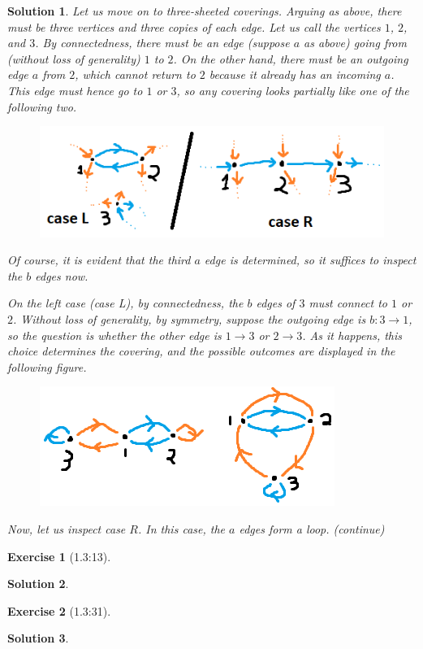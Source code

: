 \documentclass{article}
\theoremstyle{plain}
\newtheorem*{ex}{Exercise}
\theoremstyle{nonumberplain}
\newtheorem{sol}{Solution}
\begin{document}
\begin{sol}
\medskip

Let us move on to three-sheeted coverings. Arguing as above, there must be three vertices and three copies of each edge. Let us call the vertices $1$, $2$, and $3$. By connectedness, there must be an edge (suppose $a$ as above) going from (without loss of generality) $1$ to $2$. On the other hand, there must be an outgoing edge $a$ from $2$, which cannot return to $2$ because it already has an incoming $a$. This edge must hence go to $1$ or $3$, so any covering looks partially like one of the following two.
\begin{figure}[H]
\centering
\includegraphics[width=\linewidth]{cov3}
\end{figure}

Of course, it is evident that the third $a$ edge is determined, so it suffices to inspect the $b$ edges now.

On the left case (case L), by connectedness, the $b$ edges of $3$ must connect to $1$ or $2$. Without loss of generality, by symmetry, suppose the outgoing edge is $b \colon 3 \to 1$, so the question is whether the other edge is $1 \to 3$ or $2 \to 3$. As it happens, this choice determines the covering, and the possible outcomes are displayed in the following figure.
\begin{figure}[H]
\centering
\includegraphics[width=\linewidth]{cov4}
\end{figure}

Now, let us inspect case $R$. In this case, the $a$ edges form a loop. (continue)
\end{sol}

\begin{ex}[1.3:13]

\end{ex}

\begin{sol}

\end{sol}

\begin{ex}[1.3:31]

\end{ex}

\begin{sol}

\end{sol}
\end{document}
